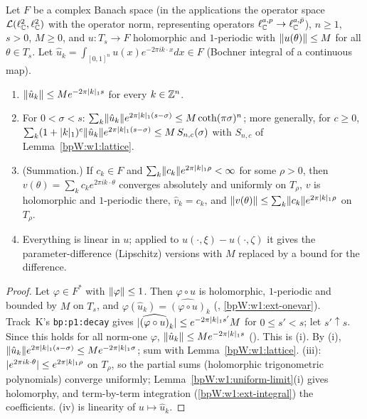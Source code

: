 \begin{lemma}\label{bpW:w1:fourier-banach}
Let $F$ be a complex Banach space (in the applications the operator space $\mathcal L(\ell^2_{\mathbb{C}},\ell^2_{\mathbb{C}})$ with the
operator norm, representing operators $\ell^{a,p}_{\mathbb{C}}\to\ell^{a,\bar p}_{\mathbb{C}}$), $n\ge1$, $s>0$, $M\ge0$, and
$u:T_s\to F$ holomorphic and $1$-periodic with $\lVert u(\theta)\rVert\le M$ for all $\theta\in T_s$. Let
$\hat u_k=\int_{[0,1]^n}u(x)e^{-2\pi ik\cdot x}dx\in F$ (Bochner integral of a continuous map).
\begin{enumerate}[label=(\roman*)]
\item $\lVert \hat u_k\rVert\le Me^{-2\pi\lvert k\rvert_1s}$ for every $k\in\mathbb{Z}^n$.
\item For $0<\sigma<s$: $\sum_k\lVert \hat u_k\rVert e^{2\pi\lvert k\rvert_1(s-\sigma)}\le M\coth(\pi\sigma)^n$; more generally, for
  $c\ge0$, $\sum_k(1+\lvert k\rvert_1)^c\lVert \hat u_k\rVert e^{2\pi\lvert k\rvert_1(s-\sigma)}\le M\,S_{n,c}(\sigma)$ with $S_{n,c}$ of
  Lemma~\ref{bpW:w1:lattice}.
\item (Summation.) If $c_k\in F$ and $\sum_k\lVert c_k\rVert e^{2\pi\lvert k\rvert_1\rho}<\infty$ for some $\rho>0$, then
  $v(\theta)=\sum_kc_ke^{2\pi ik\cdot\theta}$ converges absolutely and uniformly on $T_\rho$, $v$ is holomorphic and
  $1$-periodic there, $\hat v_k=c_k$, and $\lVert v(\theta)\rVert\le\sum_k\lVert c_k\rVert e^{2\pi\lvert k\rvert_1\rho}$ on $T_\rho$.
\item Everything is linear in $u$; applied to $u(\cdot,\xi)-u(\cdot,\zeta)$ it gives the parameter-difference
  (Lipschitz) versions with $M$ replaced by a bound for the difference.
\end{enumerate}
\end{lemma}

\begin{proof}
\label{stepW:w1:fbdual}
Let $\varphi\in F^*$ with $\lVert \varphi\rVert\le1$. Then $\varphi\circ u$ is holomorphic, $1$-periodic and bounded by $M$ on $T_s$,
and $\varphi(\hat u_k)=\widehat{(\varphi\circ u)}_k$ (,
\ref{bpW:w1:ext-onevar}).
\label{stepW:w1:fbdecay}
Track~K's \texttt{bp:p1:decay} gives $\lvert \widehat{(\varphi\circ u)}_k\rvert\le e^{-2\pi\lvert k\rvert_1s'}M$ for $0\le s'<s$; let
$s'\uparrow s$. Since this holds for all norm-one $\varphi$, $\lVert \hat u_k\rVert\le Me^{-2\pi\lvert k\rvert_1s}$
(). This is (i).
\label{stepW:w1:fbsum}
By (i), $\lVert \hat u_k\rVert e^{2\pi\lvert k\rvert_1(s-\sigma)}\le Me^{-2\pi\lvert k\rvert_1\sigma}$; sum with Lemma~\ref{bpW:w1:lattice}.
\label{stepW:w1:fbconv}
(iii): $\lvert e^{2\pi ik\cdot\theta}\rvert\le e^{2\pi\lvert k\rvert_1\rho}$ on $T_\rho$, so the partial sums (holomorphic trigonometric
polynomials) converge uniformly; Lemma~\ref{bpW:w1:uniform-limit}(i) gives holomorphy, and term-by-term integration
(\ref{bpW:w1:ext-integral}) the coefficients. (iv) is linearity of $u\mapsto\hat u_k$.
\end{proof}

